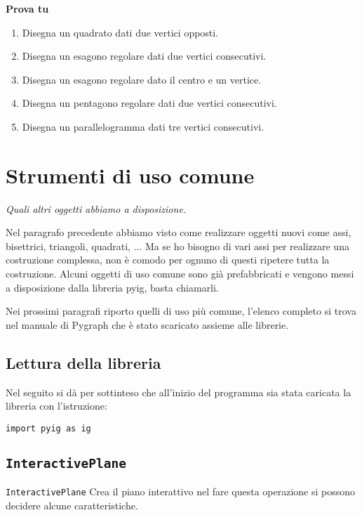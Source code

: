 \textbf{Prova tu}

\begin{enumerate} [noitemsep]
\item Disegna un quadrato dati due vertici opposti.
\item Disegna un esagono regolare dati due vertici consecutivi.
\item Disegna un esagono regolare dato il centro e un vertice.
\item Disegna un pentagono regolare dati due vertici consecutivi.
\item Disegna un parallelogramma dati tre vertici consecutivi.
\end{enumerate}


\section{Strumenti di uso comune}
\label{sec:strumenti-di-uso-comune}
\emph{Quali altri oggetti abbiamo a disposizione.}

Nel paragrafo precedente abbiamo visto come realizzare oggetti nuovi come
assi, bisettrici, triangoli, quadrati, ...
Ma se ho bisogno di vari assi per realizzare una costruzione complessa,
non è comodo per ognuno di questi ripetere tutta la costruzione.
Alcuni oggetti di uso comune sono già prefabbricati e vengono messi a
disposizione dalla libreria pyig, basta chiamarli.

Nei prossimi paragrafi riporto quelli di uso più comune, l'elenco completo
si trova nel manuale di Pygraph che è stato scaricato assieme alle librerie.

\subsection{Lettura della libreria}

Nel seguito si dà per sottinteso che all'inizio del programma sia stata 
caricata la libreria con l'istruzione:

\begin{lstlisting}
import pyig as ig
\end{lstlisting}

\subsection{\texttt{InteractivePlane}}
\label{sub:geoint_interactiveplane} 
\texttt{InteractivePlane} Crea il piano interattivo nel fare questa operazione 
si possono decidere alcune caratteristiche.

